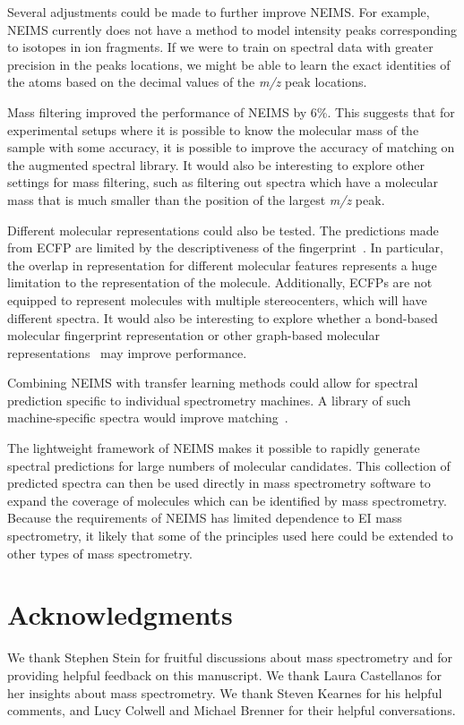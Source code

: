 Several adjustments could be made to further improve NEIMS. For example, NEIMS currently does not have a method to model intensity peaks corresponding to isotopes in ion fragments. If we were to train on spectral data with greater precision in the peaks locations, we might be able to learn the exact identities of the atoms based on the decimal values of the \textit{m/z} peak locations.

Mass filtering improved the performance of NEIMS by 6\%. This suggests that for experimental setups where it is possible to know the molecular mass of the sample with some accuracy, it is possible to improve the accuracy of matching on the augmented spectral library. It would also be interesting to explore other settings for mass filtering, such as filtering out spectra which have a molecular mass that is much smaller than the position of the largest \textit{m/z} peak.

Different molecular representations could also be tested. The predictions made from ECFP are limited by the descriptiveness of the fingerprint~\cite{rdkit_blogpost_collide_bits}. In particular, the overlap in representation for different molecular features represents a huge limitation to the representation of the molecule. Additionally, ECFPs are not equipped to represent molecules with multiple stereocenters, which will have different spectra. It would also be interesting to explore whether a bond-based molecular fingerprint representation \cite{kearnes2016molecular} or other graph-based molecular representations~\cite{duvenaud_convolutional_2015, gilmer_2017_mpnn} may improve performance.

Combining NEIMS with transfer learning methods could allow for spectral prediction specific to individual spectrometry machines. A library of such machine-specific spectra would improve matching~\cite{stein2012MassLibReview}.

The lightweight framework of NEIMS makes it possible to rapidly generate spectral predictions for large numbers of molecular candidates. This collection of predicted spectra can then be used directly in mass spectrometry software to expand the coverage of molecules which can be identified by mass spectrometry. Because the requirements of NEIMS has limited dependence to EI mass spectrometry, it likely that some of the principles used here could be extended to other types of mass spectrometry.


\section{Acknowledgments}
We thank Stephen Stein for fruitful discussions about mass spectrometry and for providing helpful feedback on this manuscript. We thank Laura Castellanos for her insights about mass spectrometry. We thank Steven Kearnes for his helpful comments, and Lucy Colwell and Michael Brenner for their helpful conversations.

